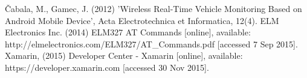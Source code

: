 \documentclass[12pt]{report}
\begin{document}
	
	
	
	\begin{thebibliography}{9}
		 {\v C}abala, M., Gamec, J. (2012) 'Wireless Real-Time Vehicle Monitoring Based on Android Mobile Device', Acta Electrotechnica et Informatica, 12(4).
		 ELM Electronics Inc. (2014) ELM327 AT Commands [online], available: 	http://elmelectronics.com/ELM327/AT{\_}Commands.pdf [accessed 7 Sep 2015].
		 Xamarin, (2015) Developer Center - Xamarin [online], available: https://developer.xamarin.com [accessed 30 Nov 2015].

	\end{thebibliography}	
	\newpage
\end{document}
